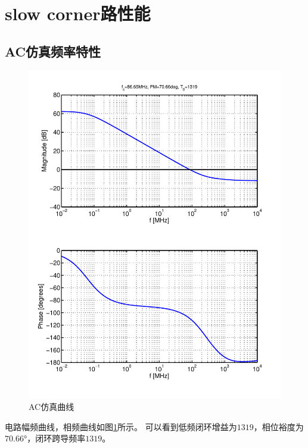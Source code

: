 \documentclass[a4paper]{article}
\newcommand{\udeg}{\si{\degree}}
\begin{document}
\newpage

\section{slow corner路性能}
\subsection{AC仿真频率特性}
\begin{figure}[htb]
    \begin{center}
        \includegraphics[width=\textwidth]{slow/ac.pdf}
    \end{center}
    \caption{AC仿真曲线}
    \label{slowac}
\end{figure}
电路幅频曲线，相频曲线如图\ref{slowac}所示。
可以看到低频闭环增益为$1319$，相位裕度为$70.66\udeg$，闭环跨导频率$1319$。
\newpage
\end{document}

